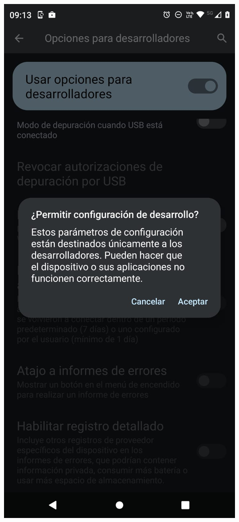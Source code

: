 \begin{frame}
\begin{columns}
\begin{center}
\includegraphics[width=0.95\linewidth]{00_Configurar/PermitirHabiliarOpcionesDesarrollo.jpg}    
\end{center}
\end{columns}
\end{frame}



